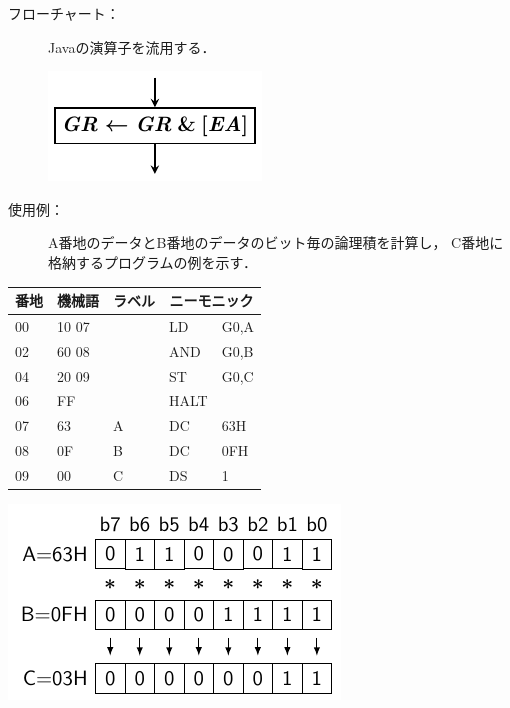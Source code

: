 \documentclass[handout]{beamer}        %
\begin{document}
\begin{frame}
  \begin{description}
  \item[フローチャート：] Javaの演算子を流用する．\\
    \vfill
    \centerline{\includegraphics[scale=0.7]{../Tikz/and_chap5.pdf}}
    \vfill
  \item[使用例：]
    A番地のデータとB番地のデータのビット毎の論理積を計算し，
    C番地に格納するプログラムの例を示す．
  \end{description}
  \vfill
  \begin{minipage}{0.58\columnwidth}
    {\ttfamily\small\begin{center}
      \begin{tabular}{|l|l|l|l l|} \hline
        番地 & 機械語 & ラベル & \multicolumn{2}{|c|}{ニーモニック} \\
        \hline
        00 & 10 07 &   & LD   & G0,A \\
        02 & 60 08 &   & AND  & G0,B \\
        04 & 20 09 &   & ST   & G0,C \\
        06 & FF    &   & HALT &      \\
        07 & 63    & A & DC   & 63H  \\
        08 & 0F    & B & DC   & 0FH  \\
        09 & 00    & C & DS   & 1    \\
        \hline
      \end{tabular}
    \end{center}}
  \end{minipage}
  \begin{minipage}{0.38\columnwidth}
    \centerline{\includegraphics[scale=0.8]{../Tikz/land1.pdf}}
  \end{minipage}
  \vfill
  \vfill
\end{frame}
\end{document}
